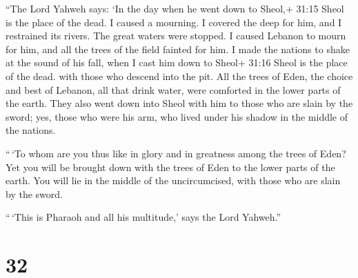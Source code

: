  ``The Lord Yahweh says: `In the day when he went down to
Sheol,+ 31:15 Sheol is the place of the dead. I caused a mourning. I
covered the deep for him, and I restrained its rivers. The great waters
were stopped. I caused Lebanon to mourn for him, and all the trees of
the field fainted for him.  I made the nations to shake at
the sound of his fall, when I cast him down to Sheol+ 31:16 Sheol is the
place of the dead. with those who descend into the pit. All the trees of
Eden, the choice and best of Lebanon, all that drink water, were
comforted in the lower parts of the earth.  They also went
down into Sheol with him to those who are slain by the sword; yes, those
who were his arm, who lived under his shadow in the middle of the
nations.

 ``\,`To whom are you thus like in glory and in greatness
among the trees of Eden? Yet you will be brought down with the trees of
Eden to the lower parts of the earth. You will lie in the middle of the
uncircumcised, with those who are slain by the sword.

``\,`This is Pharaoh and all his multitude,' says the Lord Yahweh.''

\hypertarget{section-30}{%
\section{32}\label{section-30}}

